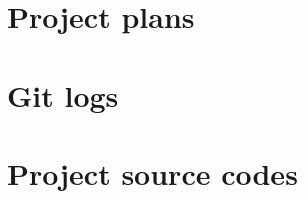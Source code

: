 \chapter{Project plans}
\label{appendix:project_plans}


\chapter{Git logs}


\chapter{Project source codes}
\label{sourcecodes}
